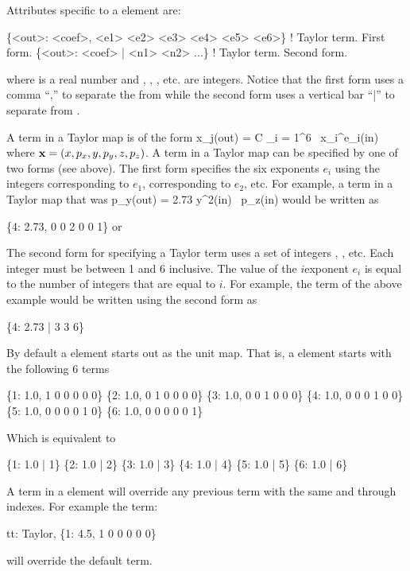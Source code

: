 {Attributes specific to a  element are:
\begin{example}
  \{<out>: <coef>, <e1> <e2> <e3> <e4> <e5> <e6>\}  ! Taylor term. First form.
  \{<out>: <coef> | <n1> <n2> ...\}                 ! Taylor term. Second form.
\end{example}
where  is a real number and , ,
, etc. are integers. Notice that the first form uses
a comma ``,'' to separate the  from  while
the second form uses a vertical bar ``|'' to separate 
from .

A term in a Taylor map is of the form
\Begineq
  x_j({\rm out}) = C \cdot \Pi_{i = 1}^6 \, x_i^{e_i}({\rm in})
\Endeq
where ${\bf x} = (x, p_x, y, p_y, z, p_z)$. A term in a Taylor map can
be specified by one of two forms (see above). The first form specifies
the six exponents $e_i$ using the integers  corresponding to
$e_1$,  corresponding to $e_2$, etc.  For example, a term in
a Taylor map that was
\Begineq
  p_y({\rm out}) = 2.73 \cdot y^2({\rm in}) \, p_z({\rm in})
\Endeq
would be written as
\begin{example}
  \{4: 2.73, 0 0 2 0 0 1\} or
\end{example}

The second form for specifying a Taylor term uses a set of integers ,
, etc. Each integer must be between 1 and 6 inclusive. The value of 
the $i$\Th exponent $e_i$ is equal to the number of integers that are equal
to $i$. For example, the term of the above example would be written using
the second form as
\begin{example}
  \{4: 2.73 | 3 3 6\}
\end{example}

By default a  element starts out as the unit map. 
That is, a  element starts with the following 6 terms
\begin{example}
  \{1: 1.0, 1 0 0 0 0 0\}
  \{2: 1.0, 0 1 0 0 0 0\}
  \{3: 1.0, 0 0 1 0 0 0\}
  \{4: 1.0, 0 0 0 1 0 0\}
  \{5: 1.0, 0 0 0 0 1 0\}
  \{6: 1.0, 0 0 0 0 0 1\}
\end{example}
Which is equivalent to
\begin{example}
  \{1: 1.0 | 1\}
  \{2: 1.0 | 2\}
  \{3: 1.0 | 3\}
  \{4: 1.0 | 4\}
  \{5: 1.0 | 5\}
  \{6: 1.0 | 6\}
\end{example}

A term in a  element will override any previous term
with the same  and  through  indexes. For example the term:
\begin{example}
  tt: Taylor, \{1: 4.5, 1 0 0 0 0 0\} 
\end{example}
will override the default  term.

}
